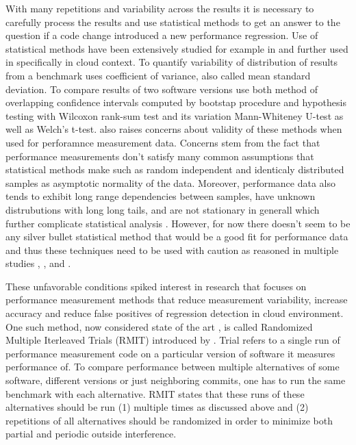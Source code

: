 With many repetitions and variability across the results it is necessary to carefully process the results and use statistical methods to get an answer to the question if a code change introduced a new performance regression.
Use of statistical methods have been extensively studied for example in \citet{bulej2017stat} and further used in \citet{laaber2019software} specifically in cloud context.
To quantify variability of distribution of results from a benchmark \citet{laaber2019software} uses coefficient of variance, also called mean standard deviation.
To compare results of two software versions \citet{bulej2017stat} use both method of overlapping confidence intervals computed by bootstap procedure and hypothesis testing with Wilcoxon rank-sum test and its variation Mann-Whiteney U-test as well as Welch's t-test.
\citet{bulej2017stat} also raises concerns about validity of these methods when used for perforamnce measurement data.
Concerns stem from the fact that performance measurements don't satisfy many common assumptions that statistical methods make such as random independent and identicaly distributed samples as asymptotic normality of the data.
Moreover, performance data also tends to exhibit long range dependencies between samples, have unknown distrubutions with long long tails, and are not stationary in generall which further complicate statistical analysis \citet{bulej2017stat}.
However, for now there doesn't seem to be any silver bullet statistical method that would be a good fit for performance data and thus these techniques need to be used with caution as reasoned in multiple studies \citet{leitner2016patterns}, \citet{laaber2019software}, and \citet{bulej2017stat}.

These unfavorable conditions spiked interest in research that focuses on performance measurement methods that reduce measurement variability, increase accuracy and reduce false positives of regression detection in cloud environment.
One such method, now considered state of the art \citet{laaber2019software}, is called Randomized Multiple Iterleaved Trials (RMIT) introduced by \citet{abedi2017conducting}.
Trial refers to a single run of performance measurement code on a particular version of software it measures performance of.
To compare performance between multiple alternatives of some software, different versions or just neighboring commits, one has to run the same benchmark with each alternative.
RMIT states that these runs of these alternatives should be run (1) multiple times as discussed above and (2) repetitions of all alternatives should be randomized in order to minimize both partial and periodic outside interference.

